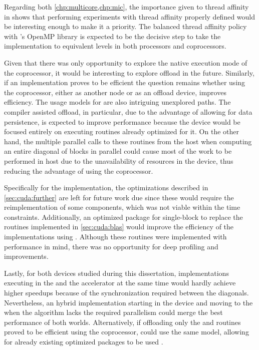 \documentclass[../thesis]{subfiles}
\begin{document}
	Regarding both \cref{chp:multicore,chp:mic}, the importance given to thread affinity in \cite{IXPCHPP:2013} shows that performing experiments with thread affinity properly defined would be interesting enough to make it a priority. The balanced thread affinity policy with \intel's OpenMP library is expected to be the decisive step to take the implementation to equivalent levels in both \xeon processors and \intel\xeonphi coprocessors.

	Given that there was only opportunity to explore the native execution mode of the \intel\xeonphi coprocessor, it would be interesting to explore offload in the future. Similarly, if an \mpi implementation proves to be efficient the question remains whether using the coprocessor, either as another node or as an offload device, improves efficiency. The usage models for \intel\mkl are also intriguing unexplored paths. The compiler assisted offload, in particular, due to the advantage of allowing for data persistence, is expected to improve performance because the device would be focused entirely on executing routines already optimized for it. On the other hand, the multiple parallel calls to these routines from the host when computing an entire diagonal of blocks in parallel could cause most of the work to be performed in host due to the unavailability of resources in the device, thus reducing the advantage of using the coprocessor.

	Specifically for the \cuda implementation, the optimizations described in \cref{sec:cuda:further} are left for future work due since these would require the reimplementation of some components, which was not viable within the time constraints. Additionally, an optimized \blas package for single-block to replace the routines implemented in \cref{sec:cuda:blas} would improve the efficiency of the implementations using \gpus. Although these routines were implemented with performance in mind, there was no opportunity for deep profiling and improvements.

	Lastly, for both devices studied during this dissertation, implementations executing in the \cpus and the accelerator at the same time would hardly achieve higher speedups because of the synchronization required between the diagonals. Nevertheless, an hybrid implementation starting in the device and moving to the \cpu when the algorithm lacks the required parallelism could merge the best performance of both worlds. Alternatively, if offloading only the \blas and \lapack routines proved to be efficient using the \intel\xeonphi coprocessor, \nvidia\gpus could use the same model, allowing for already existing optimized packages to be used \cite{NVIDIA:CUBLAS:5:0,PLASMA:MAGMA,CULA:LAPACK}.
\end{document}
